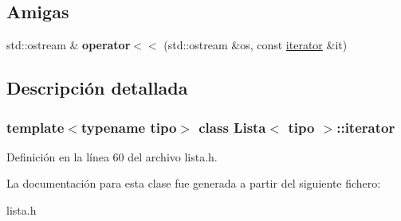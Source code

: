 \subsection*{Amigas}
\begin{DoxyCompactItemize}
\item 
\mbox{\label{classLista_1_1iterator_ab86d5cacfaca06c9075ddb7427cf7ddb}} 
std\+::ostream \& {\bfseries operator$<$$<$} (std\+::ostream \&os, const \hyperlink{classLista_1_1iterator}{iterator} \&it)
\end{DoxyCompactItemize}


\subsection{Descripción detallada}
\subsubsection*{template$<$typename tipo$>$\newline
class Lista$<$ tipo $>$\+::iterator}



Definición en la línea 60 del archivo lista.\+h.



La documentación para esta clase fue generada a partir del siguiente fichero\+:\begin{DoxyCompactItemize}
\item 
lista.\+h\end{DoxyCompactItemize}
